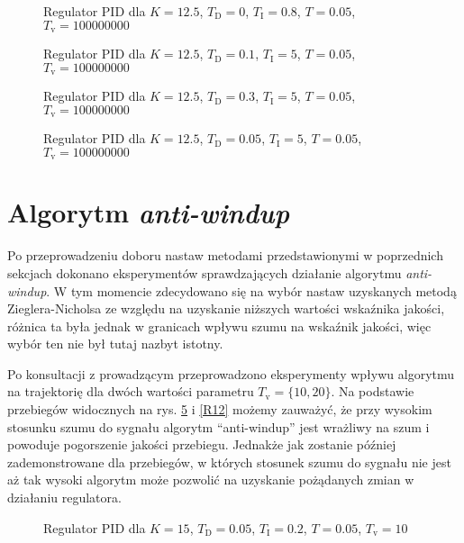 \begin{figure}[H]
\centering

\label{R7}
\caption{Regulator PID dla $K = 12.5$, $T_\mathrm{D} = 0$, $T_\mathrm{I} = 0.8$, $T = 0.05$, $T_\mathrm{v} = 100000000$}
\end{figure}


\begin{figure}[H]
\centering

\label{R8}
\caption{Regulator PID dla $K = 12.5$, $T_\mathrm{D} = 0.1$, $T_\mathrm{I} = 5$, $T = 0.05$, $T_\mathrm{v} = 100000000$}
\end{figure}

\begin{figure}[H]
\centering

\label{R9}
\caption{Regulator PID dla $K = 12.5$, $T_\mathrm{D} = 0.3$, $T_\mathrm{I} = 5$, $T = 0.05$, $T_\mathrm{v} = 100000000$}
\end{figure}

\begin{figure}[H]
\centering

\label{R10}
\caption{Regulator PID dla $K = 12.5$, $T_\mathrm{D} = 0.05$, $T_\mathrm{I} = 5$, $T = 0.05$, $T_\mathrm{v} = 100000000$}
\end{figure}

\section{Algorytm \textit{anti-windup}}
Po przeprowadzeniu doboru nastaw metodami przedstawionymi w poprzednich sekcjach dokonano eksperymentów sprawdzających działanie algorytmu \textit{anti-windup}. W tym momencie zdecydowano się na wybór nastaw uzyskanych metodą Zieglera-Nicholsa ze względu na uzyskanie niższych wartości wskaźnika jakości, różnica ta była jednak w granicach wpływu szumu na wskaźnik jakości, więc wybór ten nie był tutaj nazbyt istotny.

Po konsultacji z prowadzącym przeprowadzono eksperymenty wpływu algorytmu na trajektorię dla dwóch wartości parametru $T_\mathrm{v} = \{10, 20\}$. Na podstawie przebiegów widocznych na rys. \ref{R11} i \ref{R12} możemy zauważyć, że przy wysokim stosunku szumu do sygnału algorytm ``anti-windup'' jest wrażliwy na szum i powoduje pogorszenie jakości przebiegu. Jednakże jak zostanie później zademonstrowane dla przebiegów, w których stosunek szumu do sygnału nie jest aż tak wysoki algorytm może pozwolić na uzyskanie pożądanych zmian w działaniu regulatora.

\begin{figure}[H]
\centering

\label{R11}
\caption{Regulator PID dla $K = 15$, $T_\mathrm{D} = 0.05$, $T_\mathrm{I} = 0.2$, $T = 0.05$, $T_\mathrm{v} = 10$}
\end{figure}


